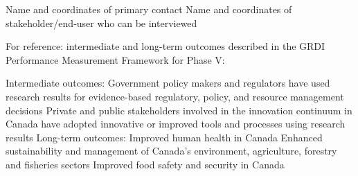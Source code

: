 Name and coordinates of primary contact
Name and coordinates of stakeholder/end-user who can be interviewed

For reference: intermediate and long-term outcomes described in the GRDI Performance Measurement Framework for Phase V:

Intermediate outcomes:
Government policy makers and regulators have used research results for evidence-based regulatory, policy, and resource management decisions
Private and public stakeholders involved in the innovation continuum in Canada have adopted innovative or improved tools and processes using research results
Long-term outcomes:
Improved human health in Canada
Enhanced sustainability and management of Canada’s environment, agriculture, forestry and fisheries sectors
Improved food safety and security in Canada
